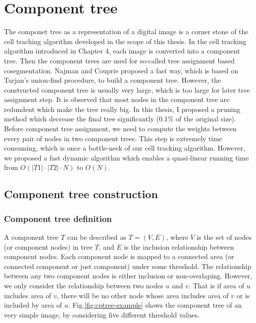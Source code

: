 \chapter{Component tree}\label{chapter:cptree} \label{chpt:cptree}
The componet tree as a representation of a digital image is a corner stone of the cell traching algorithm developed in the scope of this thesis. In the cell tracking algorithm introduced in Chapter 4, each image is converted into a component tree. Then the component trees are used for so-called tree assignment based cosegmentation. Najman and Couprie \cite{Najman:04,najman2006building} proposed a fast way, which is based on Tarjan's union-find procedure, to build a component tree. However, the constructed component tree is usually very large, which is too large for later tree assignment step. It is observed that most nodes in the component tree are redundent which make the tree really big. In this thesis, I proposed a pruning method which decrease the final tree significantly (0.1\% of the original size).\\
Before component tree assignment, we need to compute the weights between every pair of nodes in two component trees. This step is extremely time consuming, which is once a bottle-neck of our cell tracking algorithm. However, we proposed a fast dynamic algorithm which enables a quasi-linear running time from $O(|T1|\cdot|T2|\cdot N)$ to $O(N)$.
\section{Component tree construction} \label{sec:cptree-def}
\subsection{Component tree definition}
A component tree $T$ can be described as $T=(V, E)$, where $V$ is the set of nodes (or component nodes) in tree $T$, and $E$ is the inclusion relationship between component nodes. Each component node is mapped to a connected area (or connected component or just component) under some threshold. The relationship between any two component nodes is either inclusion or non-overlaping. However, we only consider the relationship between two nodes $u$ and $v$. That is if area of $u$ includes area of $v$, there will be no other node whose area includes area of $v$ or is included by area of $u$. Fig.\ref{fig:cptree-example} shows the component tree of an very simple image, by considering five different threshold values.

